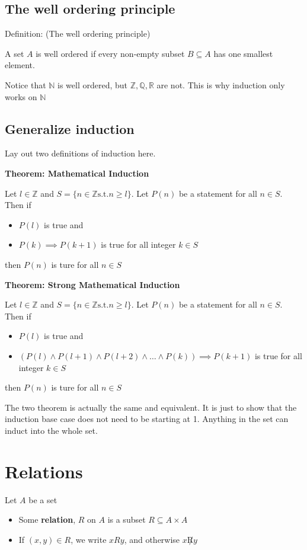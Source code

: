 \documentclass[letterpaper,12pt]{article}
\begin{document}
\subsection{The well ordering principle}
Definition: (The well ordering principle)

A set $A$ is well ordered if every non-empty subset $B \subseteq A$ has one smallest element. 

Notice that $\mathbb{N}$ is well ordered, but $\mathbb{Z, Q, R}$ are not. This is why induction only works on $\mathbb{N}$

\subsection{Generalize induction}

Lay out two definitions of induction here. 

\textbf{Theorem: Mathematical Induction}

Let $l\in \mathbb{Z}$ and $S=\{n\in\mathbb{Z}\text{s.t.}n\ge l\}$. Let $P(n)$ be a statement for all $n\in S$. Then if 
\begin{itemize}
    \item $P(l)$ is true and 
    \item $P(k)\implies P(k+1)$ is true for all integer $k\in S$
\end{itemize}
then $P(n)$ is ture for all $n\in S$

\textbf{Theorem: Strong Mathematical Induction}

Let $l\in \mathbb{Z}$ and $S=\{n\in\mathbb{Z}\text{s.t.}n\ge l\}$. Let $P(n)$ be a statement for all $n\in S$. Then if 
\begin{itemize}
    \item $P(l)$ is true and 
    \item $(P(l)\land P(l+1) \land P(l+2) \land \ldots \land P(k))\implies P(k+1)$ is true for all integer $k\in S$
\end{itemize}
then $P(n)$ is ture for all $n\in S$

The two theorem is actually the same and equivalent. It is just to show that the induction base case does not need to be starting at 1. Anything in the set can induct into the whole set.


\section{Relations}

Let $A$ be a set
\begin{itemize}
    \item Some \textbf{relation}, $R$ on $A$ is a subset $R\subseteq A\times A$
    \item If $(x,y)\in R$, we write $xRy$, and otherwise $x\not R y$
\end{itemize} 
\end{document}
